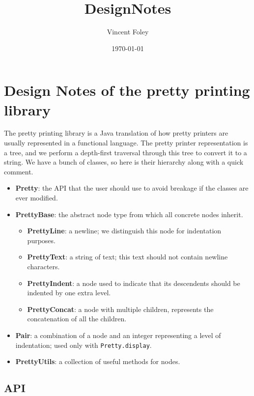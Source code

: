 \documentclass[11pt]{article}
\title{DesignNotes}
\author{Vincent Foley}
\date{\today}
\begin{document}
\maketitle

\setcounter{tocdepth}{3}
\tableofcontents
\vspace*{1cm}

\section{Design Notes of the pretty printing library}
\label{sec-1}


The pretty printing library is a Java translation of how pretty
printers are usually represented in a functional language.  The pretty
printer representation is a tree, and we perform a depth-first
traversal through this tree to convert it to a string.  We have a
bunch of classes, so here is their hierarchy along with a quick
comment.

\begin{itemize}
\item \textbf{Pretty}: the API that the user should use to avoid breakage if the
  classes are ever modified.
\item \textbf{PrettyBase}: the abstract node type from which all concrete nodes inherit.
\begin{itemize}
\item \textbf{PrettyLine}: a newline; we distinguish this node for indentation purposes.
\item \textbf{PrettyText}: a string of text; this text should not contain
    newline characters.
\item \textbf{PrettyIndent}: a node used to indicate that its descendents
    should be indented by one extra level.
\item \textbf{PrettyConcat}: a node with multiple children, represents the
    concatenation of all the children.
\end{itemize}
\item \textbf{Pair}: a combination of a node and an integer representing a level
  of indentation; used only with \texttt{Pretty.display}.
\item \textbf{PrettyUtils}: a collection of useful methods for nodes.
\end{itemize}
\subsection{API}
\label{sec-1-1}
\end{document}
